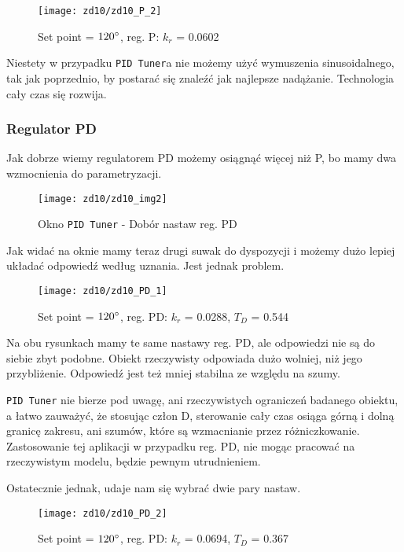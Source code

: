\documentclass[11 pt]{article}
\begin{document}
\begin{figure}[h!]
	\centerline{
		\texttt{[image: zd10/zd10\_P\_2]}
	}
	\caption{Set point = $120 \degree$, reg. P: $k_r$ = 0.0602}
\end{figure}

Niestety w przypadku \texttt{PID Tuner}a nie możemy użyć wymuszenia sinusoidalnego, tak jak poprzednio, by postarać się znaleźć jak najlepsze nadążanie. Technologia cały czas się rozwija.

\newpage

\subsubsection*{Regulator PD}

Jak dobrze wiemy regulatorem PD możemy osiągnąć więcej niż P, bo mamy dwa wzmocnienia do parametryzacji.

\begin{figure}[h!]
	\centerline{
		\texttt{[image: zd10/zd10\_img2]}
	}
	\caption{Okno \texttt{PID Tuner} - Dobór nastaw reg. PD}
\end{figure}

Jak widać na oknie mamy teraz drugi suwak do dyspozycji i możemy dużo lepiej układać odpowiedź według uznania.
Jest jednak problem.

\begin{figure}[h!]
	\centerline{
		\texttt{[image: zd10/zd10\_PD\_1]}
	}
	\caption{Set point = $120 \degree$, reg. PD: $k_r$ = 0.0288, $T_D$ = 0.544}
\end{figure}

Na obu rysunkach mamy te same nastawy reg. PD, ale odpowiedzi nie są do siebie zbyt podobne. Obiekt rzeczywisty odpowiada dużo wolniej, niż jego przybliżenie. Odpowiedź jest też mniej stabilna ze względu na szumy.

\texttt{PID Tuner} nie bierze pod uwagę, ani rzeczywistych ograniczeń badanego obiektu, a łatwo zauważyć, że stosując człon D, sterowanie cały czas osiąga górną i dolną granicę zakresu, ani szumów, które są wzmacnianie przez różniczkowanie. Zastosowanie tej aplikacji w przypadku reg. PD, nie mogąc pracować na rzeczywistym modelu, będzie pewnym utrudnieniem.

\newpage

Ostatecznie jednak, udaje nam się wybrać dwie pary nastaw.

\begin{figure}[h!]
	\centerline{
		\texttt{[image: zd10/zd10\_PD\_2]}
	}
	\caption{Set point = $120 \degree$, reg. PD: $k_r$ = 0.0694, $T_D$ = 0.367}
\end{figure}
\end{document}
